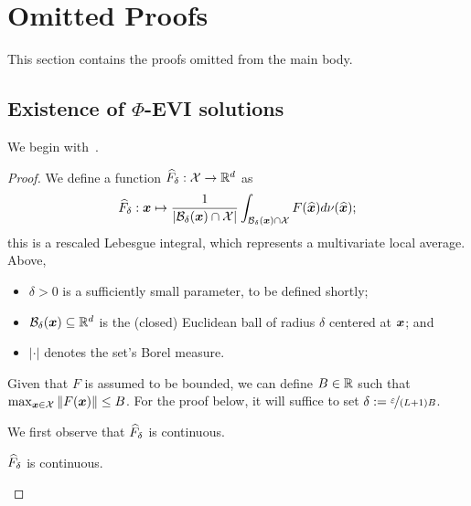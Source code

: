 \section{Omitted Proofs}
\label{sec:proofs}

This section contains the proofs omitted from the main body. 

\subsection{Existence of $\Phi$-EVI solutions}

We begin with~.

\mainexistence*

\begin{proof}
    We define a function $\widehat{F}_\delta  : {\mathcal{X}} \to \mathbb R^d$ as
    \[
        \widehat{F}_\delta: {\bm{x}} \mapsto \frac{1}{|{\mathcal{B}}_{\delta}({\bm{x}}) \cap {\mathcal{X}}|} \int_{{\mathcal{B}}_{\delta}({\bm{x}}) \cap {\mathcal{X}}} F(\widehat{{\bm{x}}}) d\nu(\widehat{{\bm{x}}});
    \]
    this is a rescaled Lebesgue integral, which represents a multivariate local average. Above,
    \begin{itemize}[noitemsep,topsep=0pt]
        \item $\delta > 0$ is a sufficiently small parameter, to be defined shortly;
        \item ${\mathcal{B}}_{\delta}({\bm{x}}) \subseteq \mathbb R^d$ is the (closed) Euclidean ball of radius $\delta$ centered at ${\bm{x}}$; and
        \item $|\cdot|$ denotes the set's Borel measure.
    \end{itemize}
    Given that $F$ is assumed to be bounded, we can define $B \in \mathbb R$ such that $\max_{{\bm{x}} \in {\mathcal{X}}} \| F({\bm{x}}) \| \leq B$. For the proof below, it will suffice to set $\delta := \nicefrac{\varepsilon}{(L+1) B}$. 

    We first observe that $\widehat{F}_\delta$ is continuous.

    \begin{claim}
        \label{lemma:cont}
        $\widehat{F}_\delta$ is continuous.
    \end{claim}


\end{proof}
